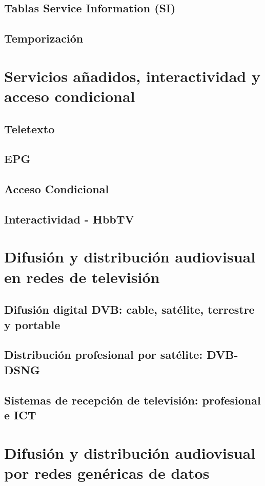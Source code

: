 \documentclass[10pt]{book}
\begin{document}
\section{Tablas Service Information (SI)}
\section{Temporización}


\chapter{Servicios añadidos, interactividad y acceso condicional}
\section{Teletexto}
\section{EPG}
\section{Acceso Condicional}
\section{Interactividad - HbbTV}

\chapter{Difusión y distribución audiovisual en redes de televisión}
\section{Difusión digital DVB: cable, satélite, terrestre y portable}
\section{Distribución profesional por satélite: DVB-DSNG}
\section{Sistemas de recepción de televisión: profesional e ICT}

\chapter{Difusión y distribución audiovisual por redes genéricas de datos}
\end{document}
